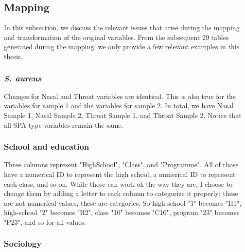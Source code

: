  



\subsection{Mapping}

In this subsection, we discuss the relevant issues that arise during the mapping and transformation of the original variables. From the subsequent 29 tables generated during the mapping, we only provide a few relevant examples in this thesis.

\subsubsection{\textit{S. aureus}}

Changes for Nasal and Throat variables are identical. This is also true for the variables for sample 1 and the variables for sample 2. In total, we have Nasal Sample 1, Nasal Sample 2, Throat Sample 1, and Throat Sample 2. Notice that all SPA-type variables remain the same.

\subsubsection{School and education}

Three columns represent "HighSchool", "Class", and "Programme". All of those have a numerical ID to represent the high school, a numerical ID to represent each class, and so on. While those can work ok the way they are, I choose to change them by adding a letter to each column to categorize it properly; these are not numerical values, these are categories. So high-school "1" becomes "H1", high-school "2" becomes "H2", class "10" becomes "C10", program "23" becomes "P23", and so for all values.

\subsubsection{Sociology}


